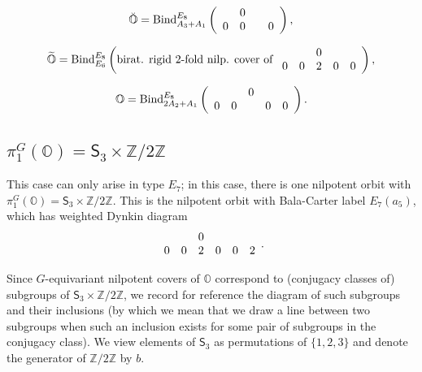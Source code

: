 \documentclass[11pt]{amsart}
\renewcommand{\O}{{\mathbb O}}
\newcommand{\bZ}{{\mathbb Z}}
\newcommand{\Sym}{{\mathsf{S}}}
\newcommand{\BInd}{{{\mbox{\rm Bind}}}}
\newcommand{\covO}{\widetilde{\O}}
\newcommand{\breveO}{\breve{\O}}
\numberwithin{equation}{section}
\begin{document}
	$$\breveO=\BInd_{A_3 + A_1}^{E_8}\left(\begin{array}{c c c c}
		& 0 & & \\
		0 & 0 &  & 0 \\
	\end{array}\right),$$
	
	$$\covO=\BInd_{E_6}^{E_8}\left(\mbox{birat. rigid 2-fold nilp. cover of }\begin{array}{c c c c c}
		& & 0 & & \\
		0 & 0 & 2 & 0 & 0 \\
	\end{array}\right),$$
	
	$$\O=\BInd_{2 A_2 + A_1}^{E_8}\left(\begin{array}{c c c c c}
		& & 0 & & \\
		0 & 0 &  & 0 & 0 \\
	\end{array}\right).$$
	
	\subsection{\texorpdfstring{$\pi_1^G(\O)=\Sym_3\times\bZ/2\bZ$}{pi=S3Z2}}\label{ss: pi=S3Z2}
	
	This case can only arise in type $E_7$; in this case, there is one nilpotent orbit with $\pi_1^G(\O)=\Sym_3\times \bZ/2\bZ$. This is the nilpotent orbit with Bala-Carter label $E_7(a_5)$, which has weighted Dynkin diagram 
	$$\begin{array}{c c c c c c}
		& & 0 & & & \\
		0 & 0 & 2 & 0 & 0 & 2 \\
	\end{array}.$$
	
	Since $G$-equivariant nilpotent covers of $\O$ correspond to (conjugacy classes of) subgroups of $\Sym_3\times\bZ/2\bZ$, we record for reference the diagram of such subgroups and their inclusions (by which we mean that we draw a line between two subgroups when such an inclusion exists for some pair of subgroups in the conjugacy class). We view elements of $\Sym_3$ as permutations of $\{1,2,3\}$ and denote the generator of $\bZ/2\bZ$ by $b$.
	
\end{document}
